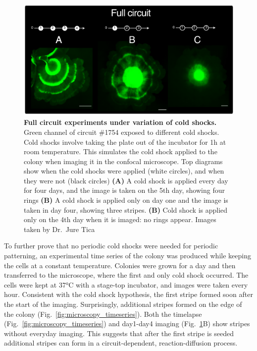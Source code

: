 \begin{figure}[H] %
    \centering
    \begin{adjustbox}{center}
        \includegraphics[width=1\textwidth]{chapters/Chapter 3/cold_shock_experiments} %
    \end{adjustbox}
    \caption{\textbf{Full circuit experiments under variation of cold shocks.} Green channel of circuit \#1754 exposed to different cold shocks. Cold shocks involve taking the plate out of the incubator for 1h at room temperature. This simulates the cold shock applied to the colony when imaging it in the confocal microscope. Top diagrams show when the cold shocks were applied (white circles), and when they were not (black circles) \textbf{(A)} A cold shock is applied every day for four days, and the image is taken on the 5th day, showing four rings \textbf{(B)} A cold shock is applied only on day one and the image is taken in day four, showing three stripes.  \textbf{(B)} Cold shock is applied only on the 4th day when it is imaged: no rings appear. Images taken by Dr.~Jure Tica}
    \label{fig:cold_shock_experiments}
\end{figure}

To further prove that no periodic cold shocks were needed for periodic patterning, an experimental time series of the colony was produced while keeping the cells at a constant temperature.
Colonies were grown for a day and then transferred to the microscope, where the first and only cold shock occurred.
The cells were kept at 37°C with a stage-top incubator, and images were taken every hour.
Consistent with the cold shock hypothesis, the first stripe formed soon after the start of the imaging.
Surprisingly, additional stripes formed on the edge of the colony (Fig.~\ref{fig:microscopy_timeseries}).
Both the timelapse (Fig.~\ref{fig:microscopy_timeseries}) and day1-day4 imaging (Fig.~\ref{fig:cold_shock_experiments}B) show stripes without everyday imaging.
This suggests that after the first stripe is seeded additional stripes can form in a circuit-dependent, reaction-diffusion process.


